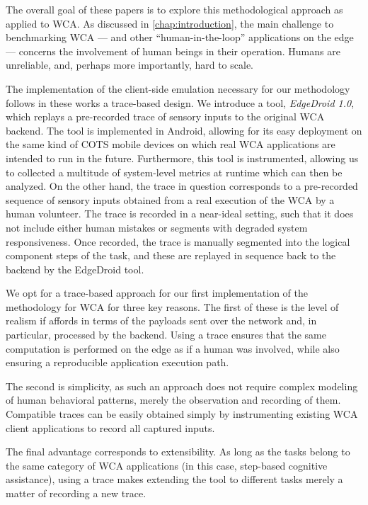 The overall goal of these papers is to explore this methodological approach as applied to \gls{WCA}.
As discussed in \cref{chap:introduction}, the main challenge to benchmarking \gls{WCA} --- and other ``human-in-the-loop'' applications on the edge --- concerns the involvement of human beings in their operation.
Humans are unreliable, and, perhaps more importantly, hard to scale.

The implementation of the client-side emulation necessary for our methodology follows in these works a trace-based design.
We introduce a tool, \emph{EdgeDroid \num{1.0}}, which replays a pre-recorded trace of sensory inputs to the original \gls{WCA} backend.
The tool is implemented in Android, allowing for its easy deployment on the same kind of \gls{COTS} mobile devices on which real \gls{WCA} applications are intended to run in the future.
Furthermore, this tool is instrumented, allowing us to collected a multitude of system-level metrics at runtime which can then be analyzed.
On the other hand, the trace in question corresponds to a pre-recorded sequence of sensory inputs obtained from a real execution of the \gls{WCA} by a human volunteer.
The trace is recorded in a near-ideal setting, such that it does not include either human mistakes or segments with degraded system responsiveness.
Once recorded, the trace is manually segmented into the logical component steps of the task, and these are replayed in sequence back to the backend by the EdgeDroid tool.

We opt for a trace-based approach for our first implementation of the methodology for \gls{WCA} for three key reasons.
The first of these is the level of realism if affords in terms of the payloads sent over the network and, in particular, processed by the backend.
Using a trace ensures that the same computation is performed on the edge as if a human was involved, while also ensuring a reproducible application execution path.

The second is simplicity, as such an approach does not require complex modeling of human behavioral patterns, merely the observation and recording of them.
Compatible traces can be easily obtained simply by instrumenting existing \gls{WCA} client applications to record all captured inputs.

The final advantage corresponds to extensibility.
As long as the tasks belong to the same category of \gls{WCA} applications (in this case, step-based cognitive assistance), using a trace makes extending the tool to different tasks merely a matter of recording a new trace.
